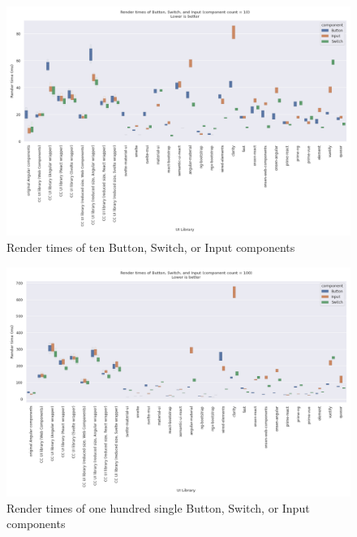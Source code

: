 	\begin{figure}[h]
		\includegraphics[width=\columnwidth]{plots/render-time-all-big-10.png}
		\caption{Render times of ten Button, Switch, or Input components}
		\label{fig:appendix:render-time-cow-10}
		\centering
	\end{figure}

	\begin{figure}[h]
		\includegraphics[width=\columnwidth]{plots/render-time-all-big-100.png}
		\caption{Render times of one hundred single Button, Switch, or Input components}
		\label{fig:appendix:render-time-cow-100}
		\centering
	\end{figure}